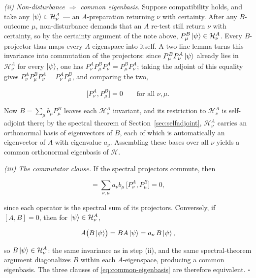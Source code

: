 \emph{(ii) Non-disturbance $\Rightarrow$ common eigenbasis.} Suppose compatibility holds, and take any $\ket{\psi}\in\mathcal H_\nu^A$ --- an $A$-preparation returning $\nu$ with certainty. After any $B$-outcome $\mu$, non-disturbance demands that an $A$ re-test still return $\nu$ with certainty, so by the certainty argument of the note above, $P_\mu^B\ket{\psi}\in\mathcal H_\nu^A$. Every $B$-projector thus maps every $A$-eigenspace into itself. A two-line lemma turns this invariance into commutation of the projectors: since $P_\mu^BP_\nu^A\ket{\psi}$ already lies in $\mathcal H_\nu^A$ for every $\ket{\psi}$, one has $P_\nu^AP_\mu^BP_\nu^A=P_\mu^BP_\nu^A$; taking the adjoint of this equality gives $P_\nu^AP_\mu^BP_\nu^A=P_\nu^AP_\mu^B$, and comparing the two,
\begin{linenomath}
\begin{equation}
    \bigl[P_\nu^A,P_\mu^B\bigr]=0
    \qquad\text{for all }\nu,\mu .
\end{equation}
\end{linenomath} Now $B=\sum_\mu b_\mu P_\mu^B$ leaves each $\mathcal H_\nu^A$ invariant, and its restriction to $\mathcal H_\nu^A$ is self-adjoint there; by the spectral theorem of Section~\ref{sec:selfadjoint}, $\mathcal H_\nu^A$ carries an orthonormal basis of eigenvectors of $B$, each of which is automatically an eigenvector of $A$ with eigenvalue $a_\nu$. Assembling these bases over all $\nu$ yields a common orthonormal eigenbasis of $\mathcal H$.

\emph{(iii) The commutator clause.} If the spectral projectors commute, then
\begin{linenomath}
\begin{equation}
    [A,B]=\sum_{\nu,\mu}a_\nu b_\mu\,\bigl[P_\nu^A,P_\mu^B\bigr]=0 ,
\end{equation}
\end{linenomath}
since each operator is the spectral sum of its projectors. Conversely, if $[A,B]=0$, then for $\ket{\psi}\in\mathcal H_\nu^A$,
\begin{linenomath}
\begin{equation}
    A\bigl(B\ket{\psi}\bigr)=BA\ket{\psi}=a_\nu\,B\ket{\psi},
\end{equation}
\end{linenomath}
so $B\ket{\psi}\in\mathcal H_\nu^A$: the same invariance as in step (ii), and the same spectral-theorem argument diagonalizes $B$ within each $A$-eigenspace, producing a common eigenbasis. The three clauses of \eqref{eq:common-eigenbasis} are therefore equivalent. \hfill$\square$

